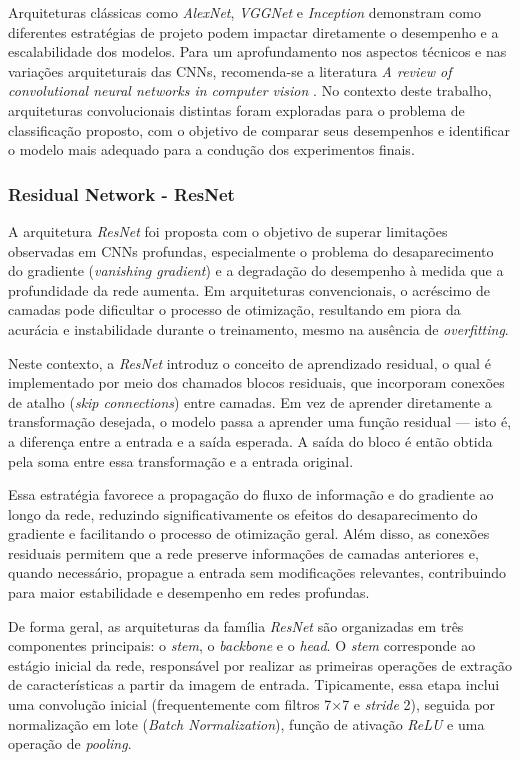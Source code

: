 Arquiteturas clássicas como \textit{AlexNet}, \textit{\acs{VGG}Net} e \textit{Inception} demonstram como diferentes estratégias de projeto podem impactar diretamente o desempenho e a escalabilidade dos modelos. Para um aprofundamento nos aspectos técnicos e nas variações arquiteturais das \acsp{CNN}, recomenda-se a literatura \textit{A review of convolutional neural networks in computer vision} \cite{zhao2024}. No contexto deste trabalho, arquiteturas convolucionais distintas foram exploradas para o problema de classificação proposto, com o objetivo de comparar seus desempenhos e identificar o modelo mais adequado para a condução dos experimentos finais.

\subsubsection*{Residual Network - ResNet}

A arquitetura \textit{ResNet} foi proposta com o objetivo de superar limitações observadas em \acsp{CNN} profundas, especialmente o problema do desaparecimento do gradiente (\textit{vanishing gradient}) e a degradação do desempenho à medida que a profundidade da rede aumenta. Em arquiteturas convencionais, o acréscimo de camadas pode dificultar o processo de otimização, resultando em piora da acurácia e instabilidade durante o treinamento, mesmo na ausência de \textit{overfitting}.

Neste contexto, a \textit{ResNet} introduz o conceito de aprendizado residual, o qual é implementado por meio dos chamados blocos residuais, que incorporam conexões de atalho (\textit{skip connections}) entre camadas. Em vez de aprender diretamente a transformação desejada, o modelo passa a aprender uma função residual — isto é, a diferença entre a entrada e a saída esperada. A saída do bloco é então obtida pela soma entre essa transformação e a entrada original.

Essa estratégia favorece a propagação do fluxo de informação e do gradiente ao longo da rede, reduzindo significativamente os efeitos do desaparecimento do gradiente e facilitando o processo de otimização geral. Além disso, as conexões residuais permitem que a rede preserve informações de camadas anteriores e, quando necessário, propague a entrada sem modificações relevantes, contribuindo para maior estabilidade e desempenho em redes profundas.

De forma geral, as arquiteturas da família \textit{ResNet} são organizadas em três componentes principais: o \textit{stem}, o \textit{backbone} e o \textit{head}. O \textit{stem} corresponde ao estágio inicial da rede, responsável por realizar as primeiras operações de extração de características a partir da imagem de entrada. Tipicamente, essa etapa inclui uma convolução inicial (frequentemente com filtros 7×7 e \textit{stride} 2), seguida por normalização em lote (\textit{Batch Normalization}), função de ativação \textit{\acs{ReLU}} e uma operação de \textit{pooling}. 

